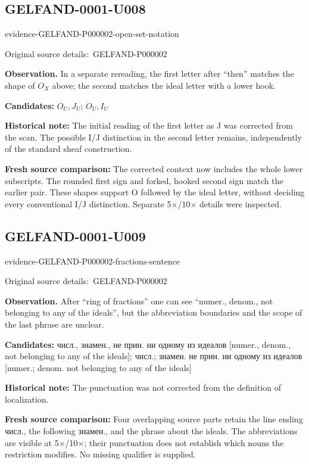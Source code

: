 \documentclass[11pt]{article}
\newcommand{\EvidenceBlock}[4]{%
 \par\smallskip\noindent\begin{minipage}{\linewidth}
 \begin{minipage}[t]{.47\linewidth}\vspace{0pt}\centering
 \csname evidence-#1-#2\endcsname\par
 {\scriptsize\SourceCropCaption\ #1}\par
 \end{minipage}\hfill
 \begin{minipage}[t]{.49\linewidth}\vspace{0pt}\raggedright
 {\small\color{orange!65!black}\textbf{#4} #3}\par
 \end{minipage}
 \end{minipage}\par\smallskip}
\newcommand{\SourceCropCaption}{Original source details:}\newcommand{\ReadingCaption}{Uncertain reading.}\newcommand{\IncompleteCaption}{Undeciphered passage.}\newcommand{\DiagramCaption}{Diagram and typed description.}
\begin{document}
\subsection*{GELFAND-0001-U008}
\EvidenceBlock{GELFAND-P000002}{open-set-notation}{In a separate rereading, the first letter after “then” matches the shape of \(O_X\) above; the second matches the ideal letter with a lower hook.}{Observation.}
\par\smallskip\noindent\textbf{Candidates: } \(O_U,J_U\); \(O_U,I_U\)\par
\par\smallskip\noindent\textbf{Historical note: } The initial reading of the first letter as J was corrected from the scan. The possible I/J distinction in the second letter remains, independently of the standard sheaf construction.\par
\par\smallskip\noindent\textbf{Fresh source comparison: } The corrected context now includes the whole lower subscripts. The rounded first sign and forked, hooked second sign match the earlier pair. These shapes support O followed by the ideal letter, without deciding every conventional I/J distinction. Separate 5×/10× details were inspected.\par

\subsection*{GELFAND-0001-U009}
\EvidenceBlock{GELFAND-P000002}{fractions-sentence}{After “ring of fractions” one can see “numer., denom., not belonging to any of the ideals”, but the abbreviation boundaries and the scope of the last phrase are unclear.}{Observation.}
\par\smallskip\noindent\textbf{Candidates: } числ., знамен., не прин. ни одному из идеалов [numer., denom., not belonging to any of the ideals]; числ.; знамен. не прин. ни одному из идеалов [numer.; denom. not belonging to any of the ideals]\par
\par\smallskip\noindent\textbf{Historical note: } The punctuation was not corrected from the definition of localization.\par
\par\smallskip\noindent\textbf{Fresh source comparison: } Four overlapping source parts retain the line ending числ., the following знамен., and the phrase about the ideals. The abbreviations are visible at 5×/10×; their punctuation does not establish which nouns the restriction modifies. No missing qualifier is supplied.\par
\end{document}
